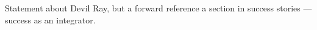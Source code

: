 Statement about Devil Ray, but a forward reference a section in success stories --- success as an integrator.
\fi




%


%

%

